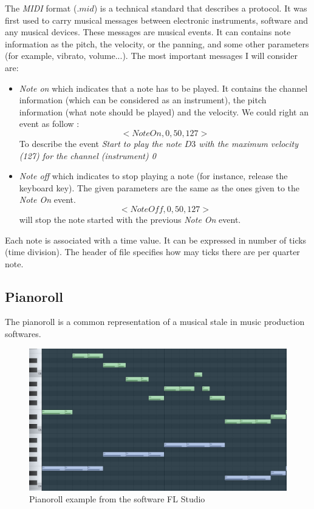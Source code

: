 \documentclass[12pt]{report}
\begin{document}

The \textit{MIDI} format ($.mid$) is a technical standard that describes a protocol.
It was first used to carry musical messages between electronic instruments, software and any musical devices.
These messages are musical events. It can contains note information as the pitch,  the velocity, or the panning, and some other parameters (for example, vibrato, volume...). 
The most important messages I will consider are:
\begin{itemize}
    \item \textit{Note on} which indicates that a note has to be played. It contains the channel information (which can be considered as an instrument), the pitch information (what note should be played) and the velocity. We could right an event as follow :
    \begin{equation}
        <NoteOn, 0, 50, 127>
    \end{equation}
    To describe the event \textit{Start to play the note $D3$ with the maximum velocity (127) for the channel (instrument) 0}
    \item \textit{Note off} which indicates to stop playing a note (for instance, release the keyboard key). The given parameters are the same as the ones given to the \textit{Note On} event.
    \begin{equation}
        <NoteOff, 0, 50, 127>
    \end{equation}
    will stop the note started with the previous \textit{Note On} event.
\end{itemize}

Each note is associated with a time value.
It can be expressed in number of ticks (time division). The header of file specifies how may ticks there are per quarter note.

\subsection{Pianoroll}

The pianoroll is a common representation of a musical stale in music production softwares.

\begin{figure}[H]
    \centering
    \includegraphics[width=0.75 \textwidth]{images/music/pianoroll/pianoroll_flstudio.jpg}
    \caption{Pianoroll example from the software FL Studio \cite{noauthor_fl_nodate}}
    \label{fig:pianoroll_flstudio}
\end{figure}
\end{document}
